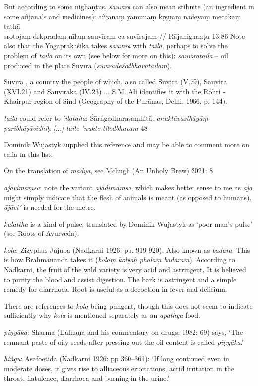 \begin{ekdosis}
\begin{philcomm}[hp01_059]
But according to some nighaṇṭus, \emph{sauvīra} can also mean stibnite (an ingredient in some añjana’s and medicines):
\startverse
añjanaṃ yāmunaṃ kṛṣṇaṃ nādeyaṃ mecakaṃ tathā \\
srotojaṃ dṛkpradaṃ nīlaṃ sauvīraṃ ca suvīrajam //  \textup{Rājanighaṇṭu 13.86}
\endverse
Note also that the Yogaprakāśikā takes \emph{sauvīra} with \emph{taila}, perhaps to solve the problem of \emph{taila} on its own (see below for more on this): \emph{sauvīrataila} -- oil produced in the place Suvīra (\emph{suvīradeśodbhavatailam}).

Suvīra , a country the people of which, also called Suvira (V.79), Sauvira (XVI.21) and Sauvīraka (IV.23) ... S.M. Ali identifies it with the Rohri - Khairpur region of Sind (Geography of the Purānas, Delhi, 1966, p. 144).

\emph{taila} could refer to \emph{tilataila}: 
Śārṅgadharasaṃhitā: 
\emph{anuktāvasthāyāṃ paribhāṣāvidhiḥ [...] taile ’nukte tilodbhavam} 48

Dominik Wujastyk supplied this reference and may be able to comment more on taila in this list.

On the translation of \emph{madya}, see Mchugh (An Unholy Brew) 2021: 8.

\emph{ajāvimāṃsa}: note the variant \emph{ajādimāṃsa}, which makes better sense to me as \emph{aja} might simply indicate that the flesh of animals is meant (as opposed to humans). 
\emph{ājāvi°} is needed for the metre.

\emph{kulattha} is a kind of pulse, translated by Dominik Wujastyk as `poor man's pulse' (see Roots of Ayurveda).

\emph{kola}: Zizyphus Jujuba (Nadkarni 1926: pp. 919-920). Also known as \emph{badara}. This is how Brahmānanda takes it (\emph{kolaṃ kolyāḥ phalaṃ badaram}). According to Nadkarni, the fruit of the wild variety is very acid and astringent. It is believed to purify the blood and assist digestion. The bark is astringent and a simple remedy for diarrhoea. Root is useful as a decoction in fever and delirium. 

There are references to \emph{kola} being pungent, though this does not seem to indicate sufficiently why \emph{kola} is mentioned separately as an \emph{apathya} food.

\emph{piṇyāka}: Sharma (Ḍalhaṇa and his commentary on drugs: 1982: 69) says, ‘The remnant paste of oily seeds after pressing out the oil content is called \emph{piṇyāka}.’ 

\emph{hiṅgu}: Asafoetida (Nadkarni 1926: pp 360–361): `If long continued even in moderate doses, it gives rise to alliaceous eructations, acrid irritation in the throat, flatulence, diarrhoea and burning in the urine.'


\end{philcomm}
\end{ekdosis}
